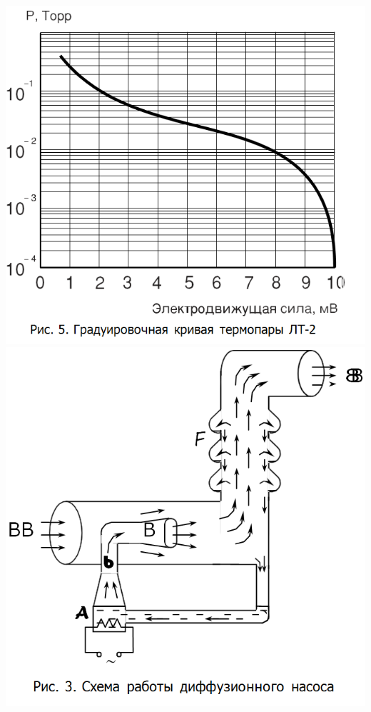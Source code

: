 \documentclass[11pt]{article}
\begin{document}
\includegraphics[scale=0.5]{pic5.png}\\
\includegraphics[scale=0.5]{pic3.png}
\end{document}

